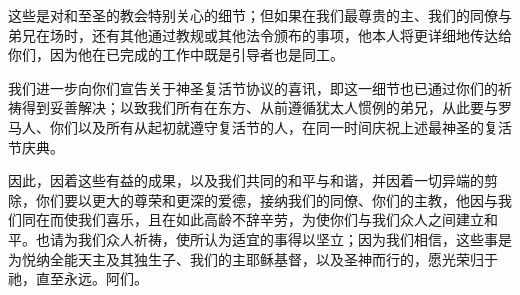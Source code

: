 这些是对和至圣的教会特别关心的细节；但如果在我们最尊贵的主、我们的同僚与弟兄在场时，还有其他通过教规或其他法令颁布的事项，他本人将更详细地传达给你们，因为他在已完成的工作中既是引导者也是同工。\par

我们进一步向你们宣告关于神圣复活节协议的喜讯，即这一细节也已通过你们的祈祷得到妥善解决；以致我们所有在东方、从前遵循犹太人惯例的弟兄，从此要与罗马人、你们以及所有从起初就遵守复活节的人，在同一时间庆祝上述最神圣的复活节庆典。\par

因此，因着这些有益的成果，以及我们共同的和平与和谐，并因着一切异端的剪除，你们要以更大的尊荣和更深的爱德，接纳我们的同僚、你们的主教，他因与我们同在而使我们喜乐，且在如此高龄不辞辛劳，为使你们与我们众人之间建立和平。也请为我们众人祈祷，使所认为适宜的事得以坚立；因为我们相信，这些事是为悦纳全能天主及其独生子、我们的主耶稣基督，以及圣神而行的，愿光荣归于祂，直至永远。阿们。\par


